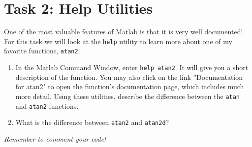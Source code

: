 \documentclass[11pt]{article}
\begin{document}
	\section*{Task 2: Help Utilities}
	\noindent One of the most valuable features of Matlab is that it is very well documented! For this task we will look at the \texttt{help} utility to learn more about one of my favorite functions, \texttt{atan2}.\\
	\begin{enumerate}[label=\alph*)]
		\item In the Matlab Command Window, enter \texttt{help atan2}. It will give you a short description of the function. You may also click on the link ''Documentation for atan2" to open the function's documentation page, which includes much more detail. Using these utilities, describe the difference between the \texttt{atan} and \texttt{atan2} functions.
		\item What is the difference between \texttt{atan2} and \texttt{atan2d}?  
	\end{enumerate}

	\begin{center}
		\vfill
		\textit{Remember to comment your code!}
	\end{center}
\end{document}

